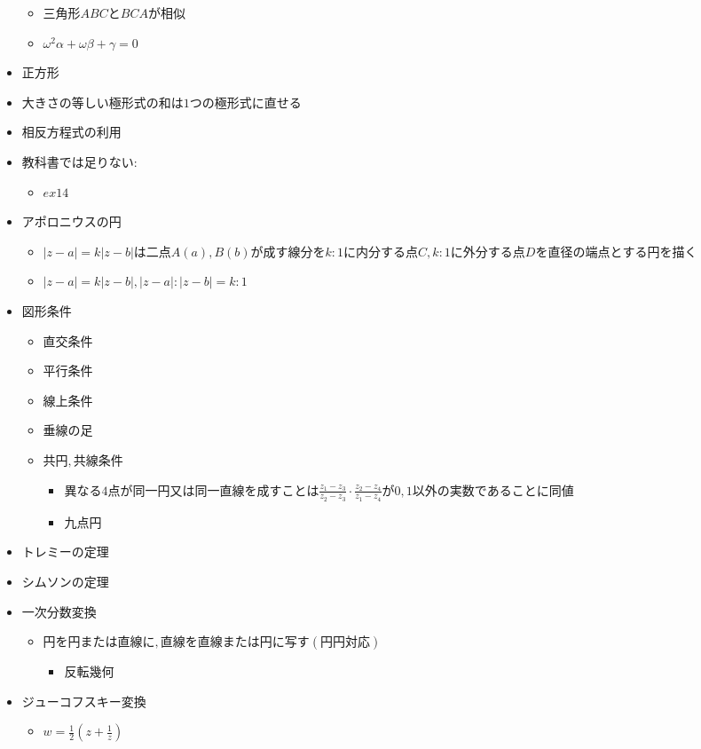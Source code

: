 \documentclass[dvipdfmx,uplatex]{jsarticle}
\begin{document}
\begin{itemize}
	\begin{itemize}
		\item $ 三角形ABCとBCAが相似$
		\item $ ω^2α+ωβ+γ=0$
	\end{itemize}
	\item $ 正方形$
	\item $ 大きさの等しい極形式の和は1つの極形式に直せる$
	\item $ 相反方程式の利用$
	\item $ 教科書では足りない:$
	\begin{itemize}
		\item $ ex14$
	\end{itemize}
	\item $ アポロニウスの円$
	\begin{itemize}
		\item $ |z-a| = k |z-b| は二点A(a),B(b)が成す線分をk:1に内分する点C,k:1に外分する点Dを直径の端点とする円を描く$
		\item $  |z-a| = k |z-b| , |z-a| : |z-b| = k : 1$
	\end{itemize}
	\item $ 図形条件$
	\begin{itemize}
		\item $ 直交条件$
		\item $ 平行条件$
		\item $ 線上条件$
		\item $ 垂線の足$
		\item $ 共円,共線条件$
		\begin{itemize}
			\item $ 異なる4点が同一円又は同一直線を成すことは \frac{z_1-z_3}{z_2-z_3} \cdot \frac{z_2-z_4}{z_1-z_4}が0,1以外の実数であることに同値$
			\item $ 九点円$
		\end{itemize}
	\end{itemize}
	\item $ トレミーの定理$
	\item $ シムソンの定理$
	\item $ 一次分数変換$
	\begin{itemize}
		\item $ 円を円または直線に,直線を直線または円に写す(円円対応)$
		\begin{itemize}
			\item $ 反転幾何$
		\end{itemize}
	\end{itemize}
	\item $ ジューコフスキー変換$
	\begin{itemize}
		\item $ w = \frac{1}{2} \left( z + \frac{1}{z} \right)$
	\end{itemize}
\end{itemize}
\end{document}
